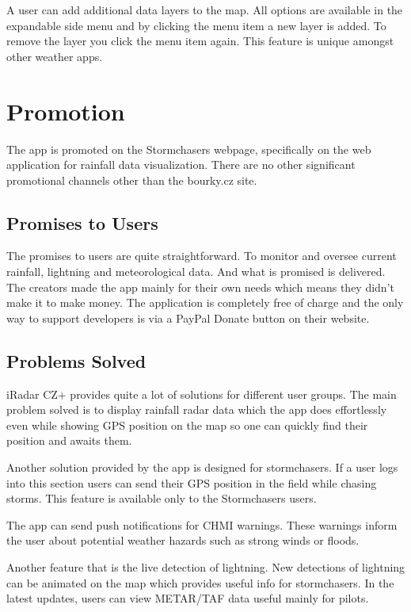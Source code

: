 \documentclass[11pt,a4paper]{article}
\begin{document}
A user can add additional data layers to the map. All options are available in the expandable side menu and by clicking the menu item a new layer is added. To remove the layer you click the menu item again. This feature is unique amongst other weather apps.

\section{Promotion}

The app is promoted on the Stormchasers webpage, specifically on the web application for rainfall data visualization\cite{radarbourky}. There are no other significant promotional channels other than the bourky.cz site.

\subsection{Promises to Users}

The promises to users are quite straightforward. To monitor and oversee current rainfall, lightning and meteorological data. And what is promised is delivered. The creators made the app mainly for their own needs which means they didn't make it to make money. The application is completely free of charge and the only way to support developers is via a PayPal Donate button on their website.

\subsection{Problems Solved}

iRadar CZ+ provides quite a lot of solutions for different user groups. The main problem solved is to display rainfall radar data which the app does effortlessly even while showing GPS position on the map so one can quickly find their position and awaits them.

Another solution provided by the app is designed for stormchasers. If a user logs into this section users can send their GPS position in the field while chasing storms. This feature is available only to the Stormchasers users.

The app can send push notifications for CHMI warnings. These warnings inform the user about potential weather hazards such as strong winds or floods.

Another feature that is the live detection of lightning. New detections of lightning can be animated on the map which provides useful info for stormchasers. In the latest updates, users can view METAR/TAF data useful mainly for pilots.
\end{document}
